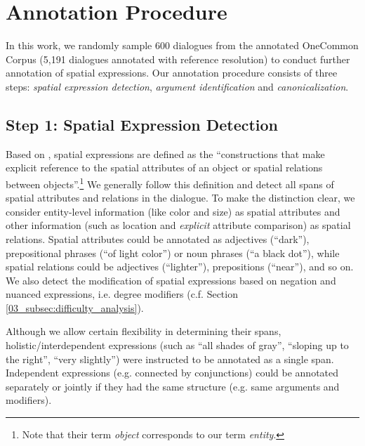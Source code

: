 \section{Annotation Procedure}
\label{05_sec:annotation_procedure}

In this work, we randomly sample 600 dialogues from the annotated OneCommon Corpus (5,191 dialogues annotated with reference resolution) to conduct further annotation of spatial expressions. Our annotation procedure consists of three steps: \textit{spatial expression detection}, \textit{argument identification} and \textit{canonicalization}.

\subsection{Step 1: Spatial Expression Detection}
\label{05_subsec:spatial_expression_detection}

Based on \citet{pustejovsky2011iso,pustejovsky2011using}, spatial expressions are defined as the ``constructions that make explicit reference to the spatial attributes of an object or spatial relations between objects''.\footnote{Note that their term \textit{object} corresponds to our term \textit{entity}.} We generally follow this definition and detect all spans of spatial attributes and relations in the dialogue. To make the distinction clear, we consider entity-level information (like color and size) as spatial attributes and other information (such as location and \textit{explicit} attribute comparison) as spatial relations. Spatial attributes could be annotated as adjectives (``dark''), prepositional phrases (``of light color'') or noun phrases (``a black dot''), while spatial relations could be adjectives (``lighter''), prepositions (``near''), and so on. We also detect the modification of spatial expressions based on negation and nuanced expressions, i.e. degree modifiers (c.f. Section \ref{03_subsec:difficulty_analysis}).

Although we allow certain flexibility in determining their spans, holistic/interdependent expressions (such as ``all shades of gray'', ``sloping up to the right'', ``very slightly'') were instructed to be annotated as a single span. Independent expressions (e.g. connected by conjunctions) could be annotated separately or jointly if they had the same structure (e.g. same arguments and modifiers).

